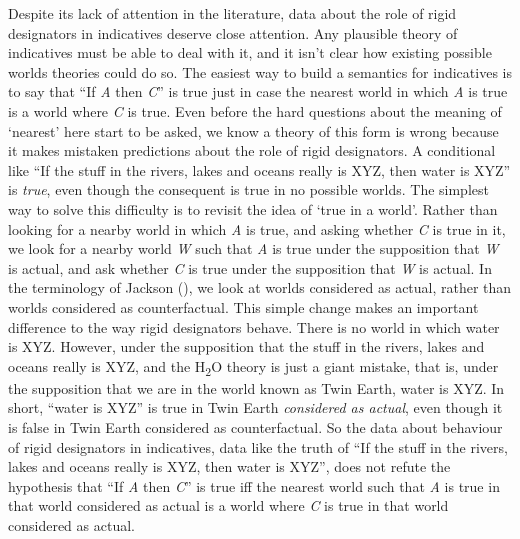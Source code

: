 \documentclass[
  11pt,
  letterpaper,
  DIV=11,
  numbers=noendperiod,
  twoside]{scrartcl}
\begin{document}
Despite its lack of attention in the literature, data about the role of
rigid designators in indicatives deserve close attention. Any plausible
theory of indicatives must be able to deal with it, and it isn't clear
how existing possible worlds theories could do so. The easiest way to
build a semantics for indicatives is to say that ``If \emph{A} then
\emph{C}'' is true just in case the nearest world in which \emph{A} is
true is a world where \emph{C} is true. Even before the hard questions
about the meaning of `nearest' here start to be asked, we know a theory
of this form is wrong because it makes mistaken predictions about the
role of rigid designators. A conditional like ``If the stuff in the
rivers, lakes and oceans really is XYZ, then water is XYZ'' is
\emph{true}, even though the consequent is true in no possible worlds.
The simplest way to solve this difficulty is to revisit the idea of
`true in a world'. Rather than looking for a nearby world in which
\emph{A} is true, and asking whether \emph{C} is true in it, we look for
a nearby world \emph{W} such that \emph{A} is true under the supposition
that \emph{W} is actual, and ask whether \emph{C} is true under the
supposition that \emph{W} is actual. In the terminology of Jackson
(), we look at worlds considered as
actual, rather than worlds considered as counterfactual. This simple
change makes an important difference to the way rigid designators
behave. There is no world in which water is XYZ. However, under the
supposition that the stuff in the rivers, lakes and oceans really is
XYZ, and the H\textsubscript{2}O theory is just a giant mistake, that
is, under the supposition that we are in the world known as Twin Earth,
water is XYZ. In short, ``water is XYZ'' is true in Twin Earth
\emph{considered as actual}, even though it is false in Twin Earth
considered as counterfactual. So the data about behaviour of rigid
designators in indicatives, data like the truth of ``If the stuff in the
rivers, lakes and oceans really is XYZ, then water is XYZ'', does not
refute the hypothesis that ``If \emph{A} then \emph{C}'' is true iff the
nearest world such that \emph{A} is true in that world considered as
actual is a world where \emph{C} is true in that world considered as
actual.
\end{document}
